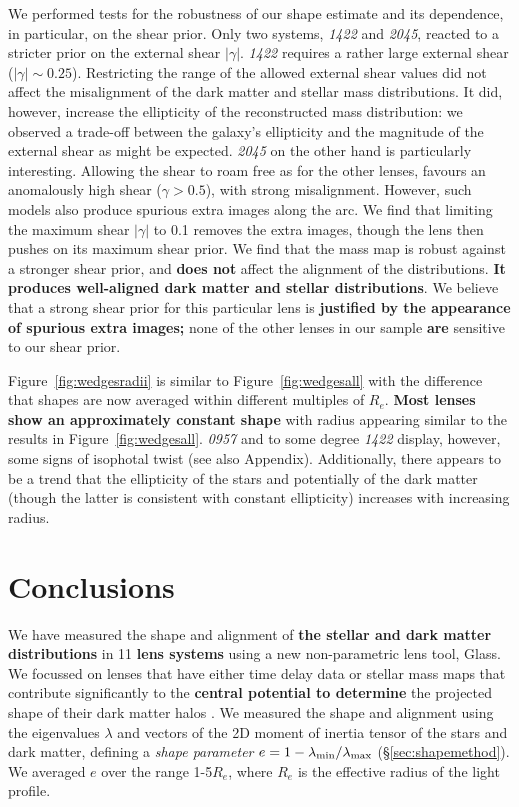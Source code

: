 \documentclass[useAMS,usenatbib]{mn2e}
\def\Glass{{\sc Glass}}
\newcommand{\cb}[1]{{\color{red} \textbf{#1}}}
\begin{document}
We performed tests for the robustness of our shape estimate and its dependence, in particular, on the shear prior. Only two systems, {\it1422} and {\it2045}, reacted to a stricter prior on the external shear $|\gamma|$. {\it1422} requires a rather large external shear ($|\gamma|\sim0.25$). Restricting the range of the allowed external shear values did not affect the misalignment of the dark matter and stellar mass distributions. It did, however, increase the ellipticity of the reconstructed mass distribution: we observed a trade-off between the galaxy's ellipticity and the magnitude of the external shear as might be expected. {\it2045} on the other hand is particularly interesting. Allowing the shear to roam free as for the other lenses, favours an anomalously high shear ($\gamma > 0.5$), with strong misalignment. However, such models also produce spurious extra images along the arc. We find that limiting the maximum shear $|\gamma|$ to 0.1 removes the extra images, though the lens then pushes on its maximum shear prior. We find that the mass map is robust against a stronger shear prior, and \cb{does not} affect the alignment of the distributions. \cb{It produces well-aligned dark matter and stellar distributions}. We believe that a strong shear prior for this particular lens is \cb{justified by the appearance of spurious extra images;} none of the other lenses in our sample \cb{are} sensitive to our shear prior.

Figure~\ref{fig:wedgesradii} is similar to Figure~\ref{fig:wedgesall} with the difference that shapes are now averaged within different multiples of $R_e$. \cb{Most lenses show an approximately constant shape} with radius appearing similar to the results in Figure~\ref{fig:wedgesall}. {\it0957} and to some degree {\it1422} display, however, some signs of isophotal twist (see also Appendix). Additionally, there appears to be a trend that the ellipticity of the stars and potentially of the dark matter (though the latter is consistent with constant ellipticity) increases with increasing radius.

\section{Conclusions}\label{sec:conclusions}
We have measured the shape and alignment of \cb{the stellar and dark matter distributions} in 11 \cb{lens systems} using a new non-parametric lens tool, \Glass. We focussed on lenses that have either time delay data or stellar mass maps that contribute significantly to the \cb{central potential to determine} the projected shape of their dark matter halos \citep{2014arXiv1401.7990C}. We measured the shape and alignment using the eigenvalues $\lambda$ and vectors of the 2D moment of inertia tensor of the stars and dark matter, defining a {\it shape parameter} $e = 1 - \lambda_{\rm min}/\lambda_{\rm max}$ (\S\ref{sec:shapemethod}). We averaged $e$ over the range 1-5$R_e$, where $R_e$ is the effective radius of the light profile.
\end{document}
